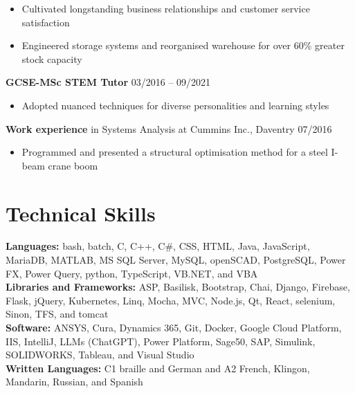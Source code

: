 \documentclass[10pt,a4paper]{article}
\begin{document}
\begin{itemize}[noitemsep]
   \item Cultivated longstanding business relationships and customer service satisfaction
   \item Engineered storage systems and reorganised warehouse for over 60\% greater stock capacity
\end{itemize}
\textbf{GCSE-MSc STEM Tutor} \hfill 03/2016 -- 09/2021\vspace{-\baselineskip}\medskip
\begin{itemize}[noitemsep]
   \item Adopted nuanced techniques for diverse personalities and learning styles
\end{itemize}
\textbf{Work experience} in Systems Analysis at Cummins Inc., Daventry \hfill 07/2016\vspace{-\baselineskip}\medskip
\begin{itemize}[noitemsep]
   \item Programmed and presented a structural optimisation method for a steel I-beam crane boom
\end{itemize}

\section*{Technical Skills}\vspace{-\baselineskip}\medskip
\textbf{Languages:} bash, batch, C, C++, C\#, CSS, HTML, Java, JavaScript, MariaDB, MATLAB, MS SQL Server, MySQL, openSCAD, PostgreSQL, Power FX, Power Query, python, TypeScript, VB.NET, and VBA\smallskip\\
\textbf{Libraries and Frameworks:} ASP, Basilisk, Bootstrap, Chai, Django, Firebase, Flask, jQuery, Kubernetes, Linq, Mocha, MVC, Node.js, Qt, React, selenium, Sinon, TFS, and tomcat\smallskip\\
\textbf{Software:} ANSYS, Cura, Dynamics 365, Git, Docker, Google Cloud Platform, IIS, IntelliJ, LLMs (ChatGPT), Power Platform, Sage50, SAP, Simulink, SOLIDWORKS, Tableau, and Visual Studio\smallskip\\
\textbf{Written Languages:} C1 braille and German and A2 French, Klingon, Mandarin, Russian, and Spanish
\end{document}
